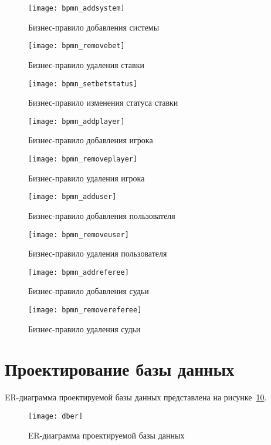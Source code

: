 \begin{figure}[H]
	\centering
	\texttt{[image: bpmn\_addsystem]}
	\caption{Бизнес-правило добавления системы}
	\label{bpmn_addsystem}
\end{figure}
\begin{figure}[H]
	\centering
	\texttt{[image: bpmn\_removebet]}
	\caption{Бизнес-правило удаления ставки}
	\label{bpmn_removebet}
\end{figure}
\begin{figure}[H]
	\centering
	\texttt{[image: bpmn\_setbetstatus]}
	\caption{Бизнес-правило изменения статуса ставки}
	\label{bpmn_setbetstatus}
\end{figure}
\begin{figure}[H]
	\centering
	\texttt{[image: bpmn\_addplayer]}
	\caption{Бизнес-правило добавления игрока}
	\label{bpmn_addplayer}
\end{figure}
\begin{figure}[H]
	\centering
	\texttt{[image: bpmn\_removeplayer]}
	\caption{Бизнес-правило удаления игрока}
	\label{bpmn_removeplayer}
\end{figure}
\begin{figure}[H]
	\centering
	\texttt{[image: bpmn\_adduser]}
	\caption{Бизнес-правило добавления пользователя}
	\label{bpmn_adduser}
\end{figure}
\begin{figure}[H]
	\centering
	\texttt{[image: bpmn\_removeuser]}
	\caption{Бизнес-правило удаления пользователя}
	\label{bpmn_removeuser}
\end{figure}
\begin{figure}[H]
	\centering
	\texttt{[image: bpmn\_addreferee]}
	\caption{Бизнес-правило добавления судьи}
	\label{bpmn_addreferee}
\end{figure}
\begin{figure}[H]
	\centering
	\texttt{[image: bpmn\_removereferee]}
	\caption{Бизнес-правило удаления судьи}
	\label{bpmn_removereferee}
\end{figure}

\section{Проектирование базы данных}

ER-диаграмма проектируемой базы данных представлена на рисунке~\ref{dber}.
\begin{figure}[H]
	\centering
	\texttt{[image: dber]}
	\caption{ER-диаграмма проектируемой базы данных}
	\label{dber}
\end{figure}

